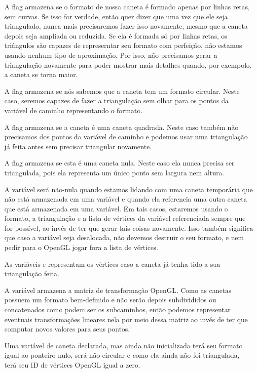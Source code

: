 A flag  armazena se o formato de nossa caneta
é formado apenas por linhas retas, sem curvas. Se isso for verdade,
então quer dizer que uma vez que ele seja triangulado, nunca mais
precisaremos fazer isso novamente, mesmo que a caneta depois seja
ampliada ou reduzida. Se ela é formada só por linhas retas, os
triângulos são capazes de represerntar seu formato com perfeição, não
estamos usando nenhum tipo de aproximação. Por isso, não precisamos
gerar a triangulação novamente para poder mostrar mais detalhes
quando, por exempolo, a caneta se torna maior.

A flag  armazena se nós sabemos que a caneta
tem um formato circular. Neste caso, seremos capazes de fazer a
triangulação sem olhar para os pontos da variável de caminho
representando o formato.

A flag  armazena se a caneta é uma caneta
quadrada. Neste caso também não precisamos dos pontos da variável de
caminho e podemos usar uma triangulação já feita antes sem precisar
triangular novamente.

A flag  armazena se esta é uma caneta
nula. Neste caso ela nunca precisa ser triangulada, pois ela
representa um único ponto sem largura nem altura.

A variável  será não-nula quando estamos
lidando com uma caneta temporária que não está armazenada em uma
variável e quando ela referencia uma outra caneta que está armazenada
em uma variável. Em tais casos, estaremos usando o formato, a
triangulação e a lista de vértices da variável referenciada sempre que
for possível, ao invés de ter que gerar tais coisas novamente. Isso
também significa que caso a variável seja desalocada, não devemos
destruir o seu formato, e nem pedir para o OpenGL jogar fora a lista
de vértices.

As variáveis  e 
representam os vértices caso a caneta já tenha tido a sua triangulação
feita.

A variável  armazena a matriz de transformação
OpenGL. Como as canetas possuem um formato bem-definido e não serão
depois subdivididos ou concatenados como podem ser os subcaminhos,
então podemos representar eventuais transformações lineares nela por
meio dessa matriz ao invés de ter que computar novos valores para seus
pontos.

Uma variável de caneta declarada, mas ainda não inicializada terá seu
formato igual ao ponteiro nulo, será não-circular e como ela ainda não
foi triangulada, terá seu ID de vértices OpenGL igual a zero.

